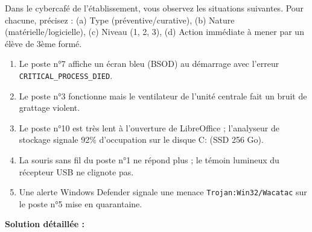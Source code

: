 \documentclass[11pt]{article}
\begin{document}
\begin{exoresolu}
Dans le cybercafé de l'établissement, vous observez les situations suivantes. Pour chacune, précisez : (a) Type (préventive/curative), (b) Nature (matérielle/logicielle), (c) Niveau (1, 2, 3), (d) Action immédiate à mener par un élève de 3ème formé.
\begin{enumerate}
    \item Le poste n°7 affiche un écran bleu (BSOD) au démarrage avec l'erreur \texttt{CRITICAL\_PROCESS\_DIED}.
    \item Le poste n°3 fonctionne mais le ventilateur de l'unité centrale fait un bruit de grattage violent.
    \item Le poste n°10 est très lent à l'ouverture de LibreOffice ; l'analyseur de stockage signale 92\% d'occupation sur le disque C: (SSD 256 Go).
    \item La souris sans fil du poste n°1 ne répond plus ; le témoin lumineux du récepteur USB ne clignote pas.
    \item Une alerte Windows Defender signale une menace \texttt{Trojan:Win32/Wacatac} sur le poste n°5 mise en quarantaine.
\end{enumerate}
\tcblower
\textbf{Solution détaillée :}


\end{exoresolu}
\end{document}
